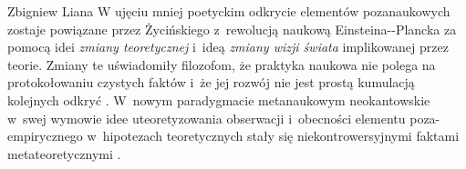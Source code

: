\begin{artplenv}{Zbigniew Liana}
W ujęciu mniej poetyckim odkrycie elementów pozanaukowych zostaje powiązane przez Życińskiego z~rewolucją naukową
Einsteina-\mbox{-Plancka} %
za pomocą idei \textit{zmiany teoretycznej} i~ideą \textit{zmiany wizji świata} implikowanej przez
teorie. Zmiany te uświadomiły filozofom, że praktyka naukowa nie polega na protokołowaniu czystych faktów
\parencites[s.~34]{zycinski_structure_1988}[s.~59]{zycinski_struktura_2013}
i~że jej rozwój nie jest prostą kumulacją
kolejnych odkryć
\parencite[zob.][s.~229]{zycinski_elementy_1996}.
W~nowym paradygmacie metanaukowym
neokantowskie w~swej wymowie idee uteoretyzowania obserwacji i~obecności elementu poza-empirycznego w~hipotezach
teoretycznych stały się niekontrowersyjnymi faktami metateoretycznymi
\parencite[por.][s.~127]{zycinski_elementy_1996}.


\end{artplenv}
